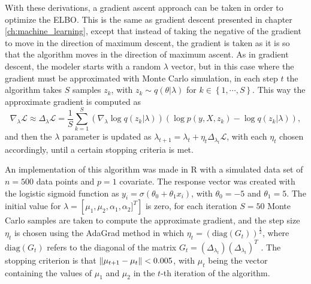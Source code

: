 With these derivations, a gradient ascent approach can be taken in order to optimize the ELBO. This is the same as gradient descent presented in chapter \ref{ch:machine_learning}, except that instead of taking the negative of the gradient to move in the direction of maximum descent, the gradient is taken as it is so that the algorithm moves in the direction of maximum ascent. As in gradient descent, the modeler starts with a random $\lambda$ vector, but in this case where the gradient must be approximated with Monte Carlo simulation, in each step $t$ the algorithm takes $S$ samples $z_k$, with $z_k \sim q(\theta | \lambda)$ for $k \in \left\{1, \cdots, S \right\}$. This way the approximate gradient is computed as
\begin{equation}
  \nabla_{\lambda} \mathcal{L} \approx \Delta_{\lambda} \mathcal{L} = \frac{1}{S} \sum_{k = 1}^S \left( \nabla_{\lambda} \log q(z_k | \lambda) \right) \left( \log p(y, X, z_k) - \log q(z_k | \lambda) \right),
\end{equation}
and then the $\lambda$ parameter is updated as $\lambda_{t+1} = \lambda_{t} + \eta_t  \Delta_{\lambda_t} \mathcal{L}$, with each $\eta_t$ chosen accordingly, until a certain stopping criteria is met.

An implementation of this algorithm was made in R with a simulated data set of $n = 500$ data points and $p = 1$ covariate. The response vector was created with the logistic sigmoid function as $y_i = \sigma(\theta_0 + \theta_1 x_i)$, with $\theta_0 = -5$ and $\theta_1 = 5$. The initial value for $\lambda = \left[ \mu_1, \mu_2, \alpha_1, \alpha_2 ]^T \right]$ is zero, for each iteration $S = 50$ Monte Carlo samples are taken to compute the approximate gradient, and the step size $\eta_t$ is chosen using the AdaGrad method in which
$\eta_t = \left( \mathrm{diag}(G_t) \right)^{\frac{1}{2}}$, where $\mathrm{diag}(G_t)$ refers to the diagonal of the matrix $G_t = \left( \Delta_{\lambda_t} \right) \left( \Delta_{\lambda_t} \right)^T$ \cite{duchi2011adaptive}. The stopping criterion is that
$\left\lVert \mu_{t+1} - \mu_{t} \right\rVert < 0.005$,
with $\mu_t$ being the vector containing the values of $\mu_1$ and $\mu_2$ in the $t$-th iteration of the algorithm.

